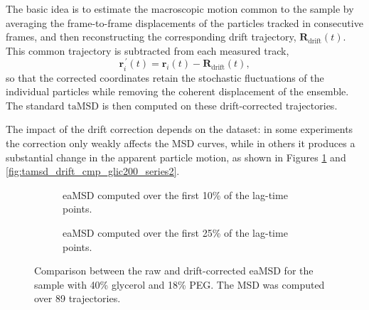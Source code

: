 \begin{itemize}
    The basic idea is to estimate the macroscopic motion common to the sample by averaging the frame-to-frame displacements of the particles tracked in consecutive frames, and then reconstructing the corresponding drift trajectory, $\mathbf{R}_{\mathrm{drift}}(t)$. This common trajectory is subtracted from each measured track,
    \begin{equation*}
        \mathbf{r}_i^{\,\prime}(t) = \mathbf{r}_i(t) - \mathbf{R}_{\mathrm{drift}}(t),
    \end{equation*}
    so that the corrected coordinates retain the stochastic fluctuations of the individual particles while removing the coherent displacement of the ensemble. The standard $\mathrm{taMSD}$ is then computed on these drift-corrected trajectories.
\end{itemize}

The impact of the drift correction depends on the dataset: in some experiments the correction only weakly affects the MSD curves, while in others it produces a substantial change in the apparent particle motion, as shown in Figures \ref{fig:eamsd_drift_cmp_glic200_series2} and \ref{fig:tamsd_drift_cmp_glic200_series2}.

\begin{figure}[!htbp]
    \centering
    \begin{subfigure}[t]{0.48\textwidth}
        \centering
        
        \caption{eaMSD computed over the first 10\% of the lag-time points.}
    \end{subfigure}
    \hfill
    \begin{subfigure}[t]{0.48\textwidth}
        \centering
        
        \caption{eaMSD computed over the first 25\% of the lag-time points.}
    \end{subfigure}

    \caption{Comparison between the raw and drift-corrected eaMSD for the sample with 40\% glycerol and 18\% PEG. The MSD was computed over 89 trajectories.}
    \label{fig:eamsd_drift_cmp_glic200_series2}
\end{figure}
\FloatBarrier

